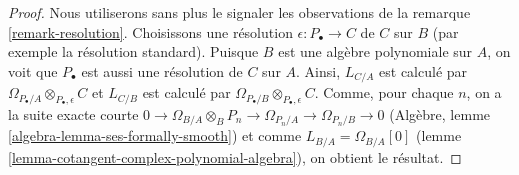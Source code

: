 \begin{proof}
Nous utiliserons sans plus le signaler les observations de la remarque
\ref{remark-resolution}. Choisissons une résolution
$\epsilon : P_\bullet \to C$ de $C$ sur $B$ (par exemple la résolution
standard). Puisque $B$ est une algèbre polynomiale sur $A$, on voit que
$P_\bullet$ est aussi une résolution de $C$ sur $A$. Ainsi, $L_{C/A}$ est
calculé par
$\Omega_{P_\bullet/A} \otimes_{P_\bullet, \epsilon} C$
et $L_{C/B}$ est calculé par
$\Omega_{P_\bullet/B} \otimes_{P_\bullet, \epsilon} C$.
Comme, pour chaque $n$, on a la suite exacte courte
$0 \to \Omega_{B/A} \otimes_B P_n \to \Omega_{P_n/A} \to \Omega_{P_n/B} \to 0$
(Algèbre, lemme \ref{algebra-lemma-ses-formally-smooth}) et comme
$L_{B/A} = \Omega_{B/A}[0]$ (lemme
\ref{lemma-cotangent-complex-polynomial-algebra}), on obtient le résultat.
\end{proof}

